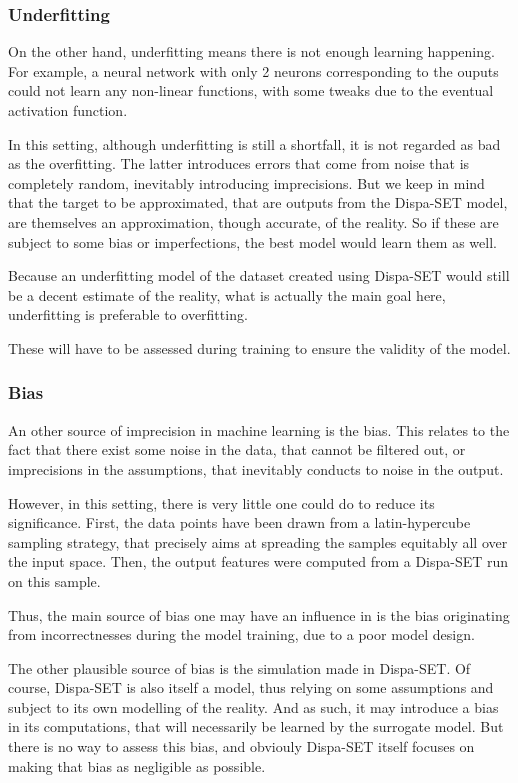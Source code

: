 \subsubsection{Underfitting}

On the other hand, underfitting means there is not enough learning happening. For example, a neural network with only 2 neurons corresponding to the ouputs could not learn any non-linear functions, with some tweaks due to the eventual activation function.

In this setting, although underfitting is still a shortfall, it is not regarded as bad as the overfitting. The latter introduces errors that come from noise that is completely random, inevitably introducing imprecisions. But we keep in mind that the target to be approximated, that are outputs from the Dispa-SET model, are themselves an approximation, though accurate, of the reality. So if these are subject to some bias or imperfections, the best model would learn them as well.

Because an underfitting model of the dataset created using Dispa-SET would still be a decent estimate of the reality, what is actually the main goal here, underfitting is preferable to overfitting.

These will have to be assessed during training to ensure the validity of the model.

\subsubsection{Bias\label{ssec:bias}}

An other source of imprecision in machine learning is the bias. This relates to the fact that there exist some noise in the data, that cannot be filtered out, or imprecisions in the assumptions, that inevitably conducts to noise in the output.

However, in this setting, there is very little one could do to reduce its significance. First, the data points have been drawn from a latin-hypercube sampling strategy, that precisely aims at spreading the samples equitably all over the input space. Then, the output features were computed from a Dispa-SET run on this sample.

Thus, the main source of bias one may have an influence in is the bias originating from incorrectnesses during the model training, due to a poor model design.

The other plausible source of bias is the simulation made in Dispa-SET. Of course, Dispa-SET is also itself a model, thus relying on some assumptions and subject to its own modelling of the reality. And as such, it may introduce a bias in its computations, that will necessarily be learned by the surrogate model. But there is no way to assess this bias, and obviouly Dispa-SET itself focuses on making that bias as negligible as possible.

